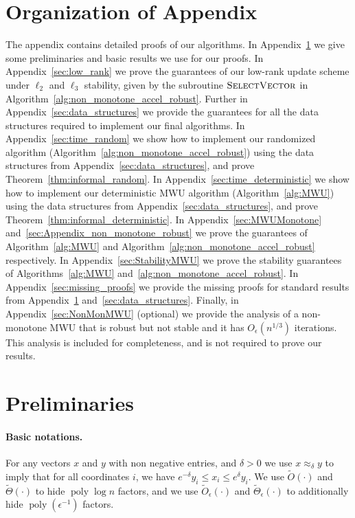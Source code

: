 \documentclass[11pt]{article}
\newcommand\yy{\boldsymbol{\mathit{y}}}
\newcommand\xx{\boldsymbol{\mathit{x}}}
\newcommand\Otil{\widetilde{O}}
\newcommand{\wt}{\widetilde}
\DeclareMathOperator*{\poly}{{\mathrm{poly}}}
\begin{document}
 \section*{Organization of Appendix}
The appendix contains detailed proofs of our algorithms. In Appendix~\ref{sec:preli} we give some preliminaries and basic results we use for our proofs. In Appendix~\ref{sec:low_rank} we prove the guarantees of our low-rank update scheme under $\ell_2$ and $\ell_3$ stability, given by the subroutine $\textsc{SelectVector}$ in Algorithm~\ref{alg:non_monotone_accel_robust}. Further in Appendix~\ref{sec:data_structures} we provide the guarantees for all the data structures required to implement our final algorithms. In Appendix~\ref{sec:time_random} we show how to implement our randomized algorithm (Algorithm~\ref{alg:non_monotone_accel_robust}) using the data structures from Appendix~\ref{sec:data_structures}, and prove Theorem~\ref{thm:informal_random}. In Appendix~\ref{sec:time_deterministic} we show how to implement our deterministic MWU algorithm (Algorithm~\ref{alg:MWU}) using the data structures from Appendix~\ref{sec:data_structures}, and prove Theorem~\ref{thm:informal_deterministic}. In Appendix~\ref{sec:MWUMonotone} and~\ref{sec:Appendix_non_monotone_robust} we prove the guarantees of Algorithm~\ref{alg:MWU} and Algorithm~\ref{alg:non_monotone_accel_robust} respectively. In Appendix~\ref{sec:StabilityMWU} we prove the stability guarantees of Algorithms~\ref{alg:MWU} and~\ref{alg:non_monotone_accel_robust}. In Appendix~\ref{sec:missing_proofs} we provide the missing proofs for standard results from Appendix~\ref{sec:preli} and~\ref{sec:data_structures}. Finally, in Appendix~\ref{sec:NonMonMWU} (optional) we provide the analysis of a non-monotone MWU that is robust but not stable and it has $O_{\epsilon}(n^{1/3})$ iterations. This analysis is included for completeness, and is not required to prove our results.

%
 
\newpage
\printbibliography

\newpage
\appendix
\section{Preliminaries}\label{sec:preli}
\paragraph{Basic notations.} For any vectors $\xx$ and $\yy$ with non negative entries, and $\delta>0$ we use $\xx\approx_{\delta}\yy$ to imply that for all coordinates $i$, we have $e^{-\delta} \yy_i \leq \xx_i \leq e^{\delta} \yy_i$. We use $\wt{O}(\cdot)$ and $\wt{\Theta}(\cdot)$ to hide $\poly \log n$ factors, and we use $\Otil_{\epsilon}(\cdot)$ and $\wt{\Theta}_{\epsilon}(\cdot)$ to additionally hide $\poly(\epsilon^{-1})$ factors.
\end{document}
